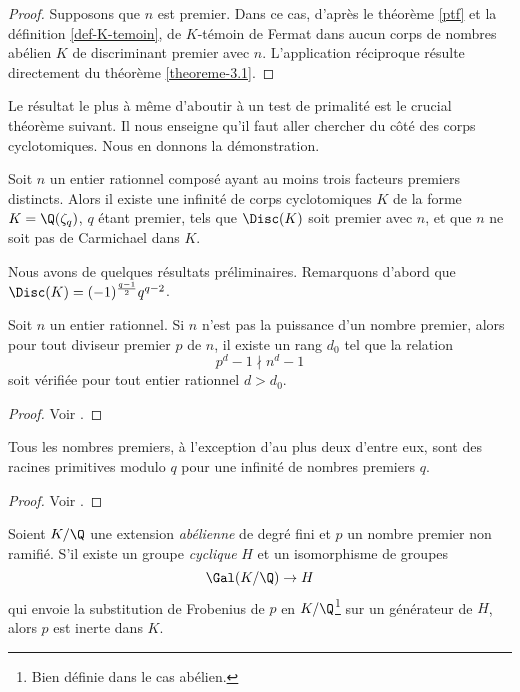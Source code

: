 \begin{proof}
	Supposons que $n$ est premier. Dans ce cas, d'après le théorème \ref{ptf} et la définition \ref{def-K-temoin}, de $K$-témoin de Fermat dans aucun corps de nombres abélien $K$ de discriminant premier avec $n$. L'application réciproque résulte directement du théorème \ref{theoreme-3.1}.
\end{proof}

Le résultat le plus à même d'aboutir à un test de primalité est le crucial théorème suivant. Il nous enseigne qu'il faut aller chercher du côté des corps cyclotomiques. Nous en donnons la démonstration.

\begin{theoreme}\label{theoreme-3.6}
	Soit $n$ un entier rationnel composé ayant au moins trois facteurs premiers distincts. Alors il existe une infinité de corps cyclotomiques $K$ de la forme $K = \Q(\zeta_q)$, $q$ étant premier, tels que $\Disc(K)$ soit premier avec $n$, et que $n$ ne soit pas de Carmichael dans $K$.
\end{theoreme}

Nous avons de quelques résultats préliminaires. Remarquons d'abord que $\Disc(K) = (-1)^{\frac{q-1}{2}} q^{q-2}$.

\begin{lemme}\label{lemme-3.3}
	Soit $n$ un entier rationnel. Si $n$ n'est pas la puissance d'un nombre premier, alors pour tout diviseur premier $p$ de $n$, il existe un rang $d_0$ tel que la relation \[p^d - 1 \nmid n^d - 1\] soit vérifiée pour tout entier rationnel $d> d_0$.
\end{lemme}

\begin{proof}
	Voir \cite{lemme33}.
\end{proof}

\begin{lemme}\label{heath-brown}
	Tous les nombres premiers, à l'exception d'au plus deux d'entre eux, sont des racines primitives modulo $q$ pour une infinité de nombres premiers $q$.
\end{lemme}

\begin{proof}
	Voir \cite{HeathBrown}.
\end{proof}

\begin{lemme}\label{lemme-inerte}
	Soient $K/\Q$ une extension \emph{abélienne} de degré fini et $p$ un nombre premier non ramifié. S'il existe un groupe \emph{cyclique} $H$ et un isomorphisme de groupes \[\Gal(K/\Q) \to H\] qui envoie la substitution de Frobenius de $p$ en $K/\Q$\footnote{Bien définie dans le cas abélien.} sur un générateur de $H$, alors $p$ est inerte dans $K$.
\end{lemme}

